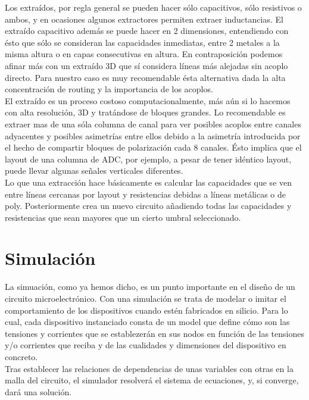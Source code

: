 Los extraídos, por regla general se pueden hacer sólo capacitivos, sólo resistivos
o ambos, y en ocasiones algunos extractores permiten extraer inductancias. El extraído
capacitivo además se puede hacer en 2 dimensiones, entendiendo con ésto que sólo
se consideran las capacidades inmediatas, entre 2 metales a la misma altura o
en capas consecutivas en altura. En contraposición podemos afinar más con un
extraído 3D que sí considera líneas más alejadas sin acoplo directo. Para nuestro
caso es muy recomendable ésta alternativa dada la alta concentración de routing y
la importancia de los acoplos.\\

El extraído es un proceso costoso computacionalmente, más aún si lo hacemos con alta
resolución, 3D y tratándose de bloques grandes. Lo recomendable es extraer mas de una
sóla columna de canal para ver posibles acoplos entre canales adyacentes y posibles
asimetrías entre ellos debido a la asimetría introducida por el hecho de compartir
bloques de polarización cada 8 canales. Ésto implica que el layout de una columna
de ADC, por ejemplo, a pesar de tener idéntico layout, puede llevar algunas señales
verticales diferentes.\\

Lo que una extracción hace básicamente es calcular las capacidades que se ven
entre líneas cercanas por layout y resistencias debidas a líneas metálicas o
de poly. Posteriormente crea un nuevo circuito añadiendo todas las capacidades
y resistencias que sean mayores que un cierto umbral seleccionado.\\

\section{Simulación}\label{cap:simulacion}

La simuación, como ya hemos dicho, es un punto importante en el diseño de un circuito
microelectrónico. Con una simulación se trata de modelar o imitar el comportamiento
de los dispositivos cuando estén fabricados en silicio. Para lo cual, cada
dispositivo instanciado consta de un model que define cómo son las tensiones y
corrientes que se establezerán en sus nodos en función de las tensiones y/o
corrientes que reciba y de las cualidades y dimensiones del dispositivo en concreto.\\

Tras establecer las relaciones de dependencias de unas variables con otras en la malla
del circuito, el simulador resolverá el sistema de ecuaciones, y, si converge, dará
una solución.\\

